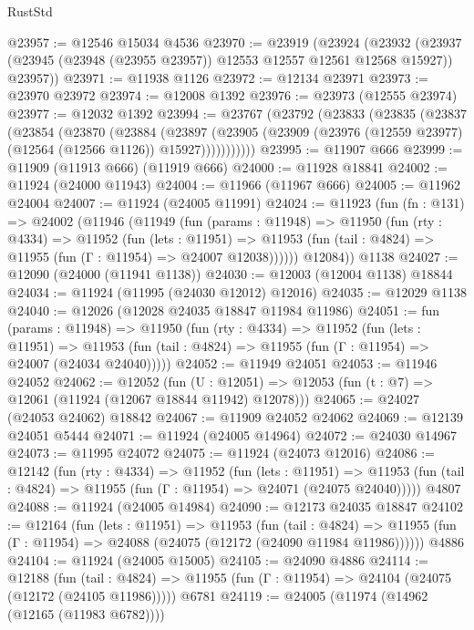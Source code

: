 \begin{lexlean}{RustStd}
\begin{coremodule}
@23957 := @12546 @15034 @4536
@23970 := @23919
    (@23924
      (@23932 (@23937 (@23945 (@23948 (@23955 @23957)) @12553 @12557 @12561 @12568 @15927)) @23957))
@23971 := @11938 @1126
@23972 := @12134 @23971
@23973 := @23970 @23972
@23974 := @12008 @1392
@23976 := @23973 (@12555 @23974)
@23977 := @12032 @1392
@23994 := @23767
    (@23792
      (@23833
        (@23835
          (@23837
            (@23854
              (@23870
                (@23884
                  (@23897
                    (@23905
                      (@23909 (@23976 (@12559 @23977) (@12564 (@12566 @1126)) @15927)))))))))))
@23995 := @11907 @666
@23999 := @11909 (@11913 @666) (@11919 @666)
@24000 := @11928 @18841
@24002 := @11924 (@24000 @11943)
@24004 := @11966 (@11967 @666)
@24005 := @11962 @24004
@24007 := @11924 (@24005 @11991)
@24024 := @11923
    (fun (fn : @131) =>
    @24002
      (@11946
        (@11949
          (fun (params : @11948) =>
          @11950
            (fun (rty : @4334) =>
            @11952
              (fun (lets : @11951) =>
              @11953 (fun (tail : @4824) => @11955 (fun (Γ : @11954) => @24007 @12038))))))
        @12084))
    @1138
@24027 := @12090 (@24000 (@11941 @1138))
@24030 := @12003 (@12004 @1138) @18844
@24034 := @11924 (@11995 (@24030 @12012) @12016)
@24035 := @12029 @1138
@24040 := @12026 (@12028 @24035 @18847 @11984 @11986)
@24051 := fun (params : @11948) =>
  @11950
    (fun (rty : @4334) =>
    @11952
      (fun (lets : @11951) =>
      @11953 (fun (tail : @4824) => @11955 (fun (Γ : @11954) => @24007 (@24034 @24040)))))
@24052 := @11949 @24051
@24053 := @11946 @24052
@24062 := @12052
    (fun (U : @12051) => @12053 (fun (t : @7) => @12061 (@11924 (@12067 @18844 @11942) @12078)))
@24065 := @24027 (@24053 @24062) @18842
@24067 := @11909 @24052 @24062
@24069 := @12139 @24051 @5444
@24071 := @11924 (@24005 @14964)
@24072 := @24030 @14967
@24073 := @11995 @24072
@24075 := @11924 (@24073 @12016)
@24086 := @12142
    (fun (rty : @4334) =>
    @11952
      (fun (lets : @11951) =>
      @11953 (fun (tail : @4824) => @11955 (fun (Γ : @11954) => @24071 (@24075 @24040)))))
    @4807
@24088 := @11924 (@24005 @14984)
@24090 := @12173 @24035 @18847
@24102 := @12164
    (fun (lets : @11951) =>
    @11953
      (fun (tail : @4824) =>
      @11955 (fun (Γ : @11954) => @24088 (@24075 (@12172 (@24090 @11984 @11986))))))
    @4886
@24104 := @11924 (@24005 @15005)
@24105 := @24090 @4886
@24114 := @12188
    (fun (tail : @4824) => @11955 (fun (Γ : @11954) => @24104 (@24075 (@12172 (@24105 @11986)))))
    @6781
@24119 := @24005 (@11974 (@14962 (@12165 (@11983 @6782))))

\end{coremodule}
\end{lexlean}
